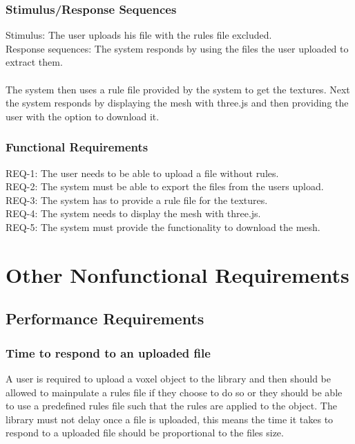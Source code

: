 \documentclass[english]{article}
\begin{document}
			 \subsubsection{Stimulus/Response Sequences}
			 	Stimulus: The user uploads his file with the rules file excluded.\\
			 	Response sequences: The system responds by using the files the user uploaded to extract them.\\\\
			 	 The system then uses a rule file provided by the system to get the textures. Next the system responds by displaying the mesh with three.js and then providing the user with the option to download it. 
			 \subsubsection{Functional Requirements}
			 	REQ-1: The user needs to be able to upload a file  without rules.\\
			 	REQ-2: The system must be able to export the files from the users upload.\\
			 	REQ-3: The system has to provide a rule file for the textures.\\
			 	REQ-4: The system needs to display the mesh with three.js.\\
			 	REQ-5: The system must provide the functionality to download the mesh.\\
	\pagebreak
	
	\section{Other Nonfunctional Requirements}
	
		\subsection{Performance Requirements}
		\subsubsection {Time to respond to an uploaded file}
		A user is required to upload a voxel object to the library and then should be allowed to mainpulate a rules file if they choose to do so or they should be able to use a predefined rules file such that the rules are applied to the object. The library must not delay once a file is uploaded, this means the time it takes to respond to a uploaded file should be proportional to the files size.
		
\end{document}
